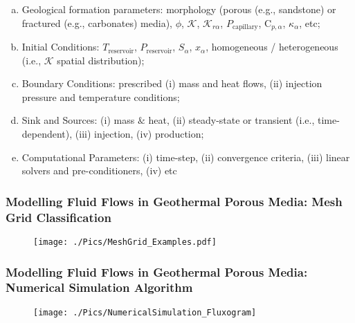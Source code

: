 \documentclass[10pt,compress,unknownkeysallowed]{beamer}
\begin{document}
\begin{frame}
\begin{enumerate}[1.]
\begin{enumerate}[(a)]
\begin{enumerate}[{b.}i)]
                       \end{enumerate}
                   \item <7-> Geological formation parameters: morphology (porous (e.g., sandstone) or fractured (e.g., carbonates) media), $\phi$, $\mathcal{K}$, $\mathcal{K}_{r\alpha}$, $P_{\text{capillary}}$, C$_{p,\alpha}$, $\kappa_{\alpha}$, etc;
                   \item <8-> Initial Conditions: $T_{\text{reservoir}}$, $P_{\text{reservoir}}$, $S_{\alpha}$, $x_{\alpha}$, homogeneous / heterogeneous (i.e., $\mathcal{K}$ spatial distribution);
                   \item <9-> Boundary Conditions: prescribed (i) mass and heat flows, (ii) injection pressure and temperature conditions;
                   \item <10-> Sink and Sources: (i) mass $\&$ heat, (ii) steady-state or transient (i.e., time-dependent), (iii) injection, (iv) production;
                   \item <11-> Computational Parameters: (i) time-step, (ii) convergence criteria, (iii) linear solvers and pre-conditioners, (iv) etc
               \end{enumerate}
         \end{enumerate}
\end{frame}


\begin{frame}
 \frametitle{Modelling Fluid Flows in Geothermal Porous Media: Mesh Grid Classification}

   \begin{figure}%
     \texttt{[image: ./Pics/MeshGrid\_Examples.pdf]}\label{xx}
   \end{figure}  

\end{frame}




\begin{frame}
 \frametitle{Modelling Fluid Flows in Geothermal Porous Media: Numerical Simulation Algorithm}

   \begin{figure}%
     \texttt{[image: ./Pics/NumericalSimulation\_Fluxogram]}
   \end{figure}  

\end{frame}
\end{document}
